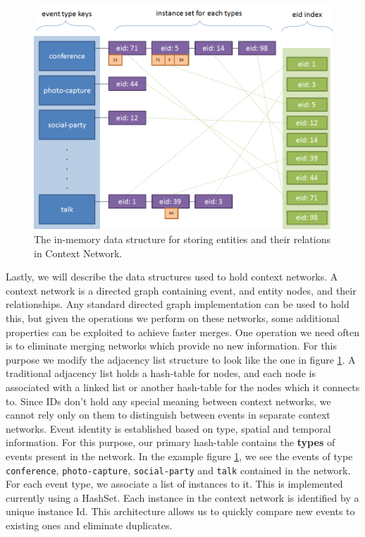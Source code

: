 \begin{figure}[h]
\centering
\includegraphics[width=\textwidth]{media/chapter4/adj-list.png}
\caption{The in-memory data structure for storing entities and their relations in Context Network.}
\label{fig:adj-list}
\end{figure}

Lastly, we will describe the data structures used to hold context networks. A context network is a directed graph containing event, and entity nodes, and their relationships. Any standard directed graph implementation can be used to hold this, but given the operations we perform on these networks, some additional properties can be exploited to achieve faster merges. One operation we need often is to eliminate merging networks which provide no new information. For this purpose we modify the adjacency list structure to look like the one in figure \ref{fig:adj-list}. A traditional adjacency list holds a hash-table for nodes, and each node is associated with a linked list or another hash-table for the nodes which it connects to. Since IDs don't hold any special meaning between context networks, we cannot rely only on them to distinguish between events in separate context networks. Event identity is established based on type, spatial and temporal information. For this purpose, our primary hash-table contains the \textbf{types} of events present in the network. In the example figure \ref{fig:adj-list}, we see the events of type \texttt{conference}, \texttt{photo-capture}, \texttt{social-party} and \texttt{talk} contained in the network. For each event type, we associate a list of instances to it. This is implemented currently using a HashSet. Each instance in the context network is identified by a unique instance Id. This architecture allows us to quickly compare new events to existing ones and eliminate duplicates. 

